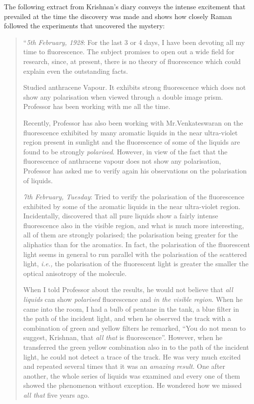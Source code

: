 The following extract from Krishnan's diary conveys the
intense excitement that prevailed at the time the discovery was
made and shows how closely Raman followed the experiments
that uncovered the mystery:
\begin{quote}
{\fontsize{10pt}{12pt}\selectfont
``{\em 5th February, 1928}: For the last 3 or 4 days, I have been
devoting all my time to fluorescence. The subject promises to open
out a wide field for research, since, at present, there is no theory
of fluorescence which could explain even the outstanding facts.

Studied anthracene Vapour. It exhibits strong fluorescence
which does not show any polarisation when viewed through a
double image prism. Professor has been working with me all
the time.

Recently, Professor has also been working with Mr.\@ Venkate\-swaran on the fluorescence exhibited by many aromatic liquids in the near ultra-violet region present in sunlight and the fluorescence
of some of the liquids are found to be strongly {\em polarised}.
However, in view of the fact that the fluorescence of anthracene
vapour does not show any polarisation, Professor has asked me
to verify again his observations on the polarisation of liquids.

{\em 7th February, Tuesday}: Tried to verify the polarisation of
the fluorescence exhibited by some of the aromatic liquids in the
near ultra-violet region. Incidentally, discovered that all pure
liquids show a fairly intense fluorescence also in the visible region,
and what is much more interesting, all of them are strongly
polarised; the polarisation being greater for the aliphatics than
for the aromatics. In fact, the polarisation of the fluorescent light
seems in general to run parallel with the polarisation of the
scattered light, {\em i.e.,} the polarisation of the fluorescent light is
greater the smaller the optical anisotropy of the molecule.

When I told Professor about the results, he would not believe
that {\em all liquids} can show {\em polarised} fluorescence and {\em in the visible
region}. When he came into the room, I had a bulb of pentane
in the tank, a blue filter in the path of the incident light, and when
he observed the track with a combination of green and yellow
filters he remarked, ``You do not mean to suggest, Krishnan, that
{\em all that} is fluorescence''. However, when he transferred the green
yellow combination also in to the path of the incident light, he
could not detect a trace of the track. He was very much excited
and repeated several times that it was an {\em amazing result}. One after
another, the whole series of liquids was examined and every one
of them showed the phenomenon without exception. He wondered
how we missed {\em all that} five years ago.

}
\end{quote}
